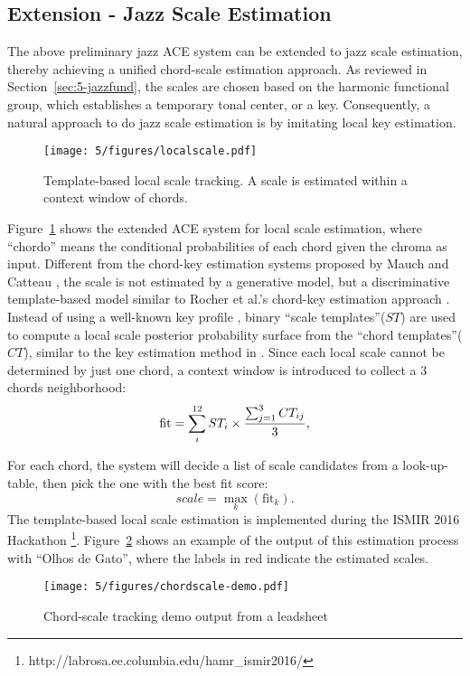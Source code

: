 \subsection{Extension - Jazz Scale Estimation}
The above preliminary jazz ACE system can be extended to jazz scale estimation, thereby achieving a unified chord-scale estimation approach. As reviewed in Section~\ref{sec:5-jazzfund}, the scales are chosen based on the harmonic functional group, which establishes a temporary tonal center, or a key. Consequently, a natural approach to do jazz scale estimation is by imitating local key estimation.
\begin{figure}[htb]
    \centering
        \texttt{[image: 5/figures/localscale.pdf]}
    \caption{Template-based local scale tracking. A scale is estimated within a context window of chords.}
    \label{fig:5-localscale}
\end{figure}
Figure~\ref{fig:5-localscale} shows the extended ACE system for local scale estimation, where ``chordo'' means the conditional probabilities of each chord given the chroma as input. Different from the chord-key estimation systems proposed by Mauch \cite{mauch2010simultaneous} and Catteau \cite{catteau2007probabilistic}, the scale is not estimated by a generative model, but a discriminative template-based model similar to Rocher et al.'s chord-key estimation approach \cite{rocher2010concurrent}. Instead of using a well-known key profile \cite{temperley2004cognition}, binary ``scale templates''($ST$) are used to compute a local scale posterior probability surface from the ``chord templates''($CT$), similar to the key estimation method in \cite{hu2015safedj}. Since each local scale cannot be determined by just one chord, a context window is introduced to collect a 3 chords neighborhood:
\begin{equation}
\text{fit} = \sum_i^{12} ST_i \times {\sum_{j=1}^3 CT_{ij} \over 3},
\end{equation}

For each chord, the system will decide a list of scale candidates from a look-up-table, then pick the one with the best fit score:
\begin{equation}
scale = \max_k (\text{fit}_k).
\end{equation}
The template-based local scale estimation is implemented during the ISMIR 2016 Hackathon \footnote{http://labrosa.ee.columbia.edu/hamr\_ismir2016/}. Figure~\ref{fig:5-chordscale} shows an example of the output of this estimation process with ``Olhos de Gato'', where the labels in red indicate the estimated scales.
\begin{figure}[h]
    \centering
        \texttt{[image: 5/figures/chordscale-demo.pdf]}
    \caption{Chord-scale tracking demo output from a leadsheet}
    \label{fig:5-chordscale}
\end{figure}

